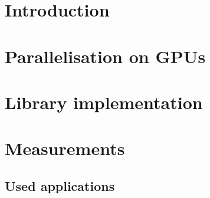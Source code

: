 \section{Introduction}\label{introduction}



\section{Parallelisation on GPUs}\label{parallelisation-on-gpu}



\section{Library implementation}\label{library-implementation}



\section{Measurements}\label{measurements}

\subsection{Used applications}\label{used-applications}


